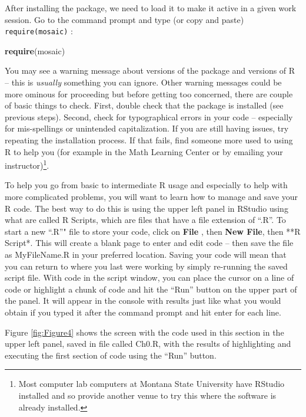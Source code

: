 \documentclass[]{book}
\newenvironment{Shaded}{\begin{snugshade}}{\end{snugshade}}
\newcommand{\KeywordTok}[1]{\textcolor[rgb]{0.13,0.29,0.53}{\textbf{{#1}}}}
\newcommand{\NormalTok}[1]{{#1}}
\let\rmarkdownfootnote\footnote%
\def\footnote{\protect\rmarkdownfootnote}
\begin{document}
After installing the package, we need to load it to make it active in a
given work session. Go to the command prompt and type (or copy and
paste) \texttt{require(mosaic)} :

\begin{Shaded}
\begin{Highlighting}[]
\KeywordTok{require}\NormalTok{(mosaic)}
\end{Highlighting}
\end{Shaded}

You may see a warning message about versions of the package and versions
of R -- this is \emph{usually} something you can ignore. Other warning
messages could be more ominous for proceeding but before getting too
concerned, there are couple of basic things to check. First, double
check that the package is installed (see previous steps). Second, check
for typographical errors in your code -- especially for mis-spellings or
unintended capitalization. If you are still having issues, try repeating
the installation process. If that fails, find someone more used to using
R to help you (for example in the Math Learning Center or by emailing
your instructor)\footnote{Most computer lab computers at Montana State
  University have RStudio installed and so provide another venue to try
  this where the software is already installed.}.

To help you go from basic to intermediate R usage and especially to help
with more complicated problems, you will want to learn how to manage and
save your R code. The best way to do this is using the upper left panel
in RStudio using what are called R Scripts, which are files that have a
file extension of ``.R''. To start a new ``.R''" file to store your
code, click on \textbf{File} , then \textbf{New File}, then **R Script*.
This will create a blank page to enter and edit code -- then save the
file as MyFileName.R in your preferred location. Saving your code will
mean that you can return to where you last were working by simply
re-running the saved script file. With code in the script window, you
can place the cursor on a line of code or highlight a chunk of code and
hit the ``Run'' button on the upper part of the panel. It will appear in
the console with results just like what you would obtain if you typed it
after the command prompt and hit enter for each line.

Figure \ref{fig:Figure4} shows the screen with the code used in this
section in the upper left panel, saved in file called Ch0.R, with the
results of highlighting and executing the first section of code using
the ``Run'' button.
\end{document}
